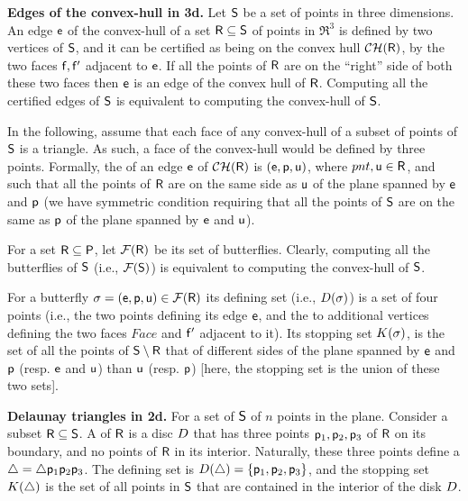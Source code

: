 \begin{compactenumA}
    \smallskip
    \item \textbf{Edges of the convex-hull in 3d.}  Let $\mathsf{S}$ be a
    set of points in three dimensions.  An edge $\mathsf{e}$ of the
    convex-hull of a set $\mathsf{R} \subseteq \mathsf{S}$ of points in
    $\Re^3$ is defined by two vertices of $\mathsf{S}$, and it can be
    certified as being on the convex hull $\CHX{\Sample}$, by the two
    faces $\mathsf{f}, \mathsf{f}'$ adjacent to $\mathsf{e}$. If all the points of
    $\mathsf{R}$ are on the ``right'' side of both these two faces then
    $\mathsf{e}$ is an edge of the convex hull of $\mathsf{R}$.  Computing all
    the certified edges of $\mathsf{S}$ is equivalent to computing the
    convex-hull of $\mathsf{S}$.
    
    In the following, assume that each face of any convex-hull of a
    subset of points of $\mathsf{S}$ is a triangle. As such, a face of
    the convex-hull would be defined by three points.  Formally, the
     of an edge $\mathsf{e}$ of $\CHX{\Sample}$ is
    $(\mathsf{e}, \mathsf{p}, \mathsf{u})$, where $pnt, \mathsf{u} \in \mathsf{R}$, and such
    that all the points of $\mathsf{R}$ are on the same side as $\mathsf{u}$
    of the plane spanned by $\mathsf{e}$ and $\mathsf{p}$ (we have symmetric
    condition requiring that all the points of $\mathsf{S}$ are on the
    same as $\mathsf{p}$ of the plane spanned by $\mathsf{e}$ and $\mathsf{u}$).
    
    For a set $\mathsf{R} \subseteq {\mathsf{P}}$, let $\RegionsSet{\Sample}$
    be its set of butterflies.  Clearly, computing all the butterflies
    of $\mathsf{S}$ (i.e., $\RegionsSet{\ObjSet}$) is equivalent to
    computing the convex-hull of $\mathsf{S}$.
    
    For a butterfly $\Trap = \pth{\Edge, \pnt, \pntA} \in
    \RegionsSet{\Sample}$ its defining set (i.e., $\DefSet{\Trap}$) is
    a set of four points (i.e., the two points defining its edge
    $\mathsf{e}$, and the to additional vertices defining the two faces
    $Face$ and $\mathsf{f}'$ adjacent to it). Its stopping set
    $\KillSet{\Trap}$, is the set of all the points of
    $\mathsf{S}\setminus \mathsf{R}$ that of different sides of the plane
    spanned by $\mathsf{e}$ and $\mathsf{p}$ (resp. $\mathsf{e}$ and $\mathsf{u}$) than
    $\mathsf{u}$ (resp. $\mathsf{p}$) [here, the stopping set is the union of
    these two sets].

    \smallskip%
    \item \textbf{Delaunay triangles in 2d.}  For a set of $\mathsf{S}$
    of $n$ points in the plane. Consider a subset
    $\mathsf{R} \subseteq \mathsf{S}$. A  of $\mathsf{R}$ is a disc $D$ that
    has three points $\mathsf{p}_1, \mathsf{p}_2, \mathsf{p}_3$ of $\mathsf{R}$ on its
    boundary, and no points of $\mathsf{R}$ in its interior. Naturally,
    these three points define a 
    $\triangle = \triangle \mathsf{p}_1 \mathsf{p}_2 \mathsf{p}_3$. The defining set is
    $\DefSet{\triangle} = \brc{\pnt_1, \pnt_2, \pnt_3}$, and the
    stopping set $\KillSet{\triangle}$ is the set of all points in
    $\mathsf{S}$ that are contained in the interior of the disk $D$.
    
\end{compactenumA}


